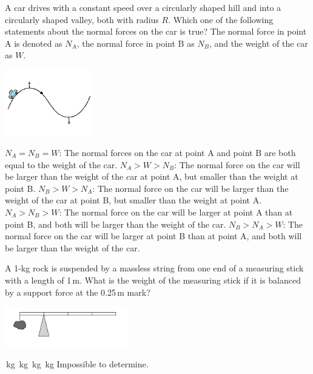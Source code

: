 \documentclass[letterpaper,addpoints,answers]{exam}
\begin{document}
\begin{questions}

\printanswers


\begin{question}[5]
\begin{multicols}{2}
A car drives with a constant speed over a circularly shaped hill and into a circularly shaped valley, both with radius $R$. Which one of the following statements about the normal forces on the car is true? The normal force in point A is denoted as $N_A$, the normal force in point B as $N_B$, and the weight of the car as $W$.
\begin{center}
\includegraphics[width=0.28\textwidth]{final/car_hill}
\end{center}
\end{multicols}
\begin{checkboxes}
 \choice $N_A = N_B = W$: The normal forces on the car at point A and point B are both equal to the weight of the car.
 \choice $N_A > W > N_B$: The normal force on the car will be larger than the weight of the car at point A, but smaller than the weight at point B.
 \correctchoice $N_B > W > N_A$: The normal force on the car will be larger than the weight of the car at point B, but smaller than the weight at point A.
 \choice $N_A > N_B > W$: The normal force on the car will be larger at point A than at point B, and both will be larger than the weight of the car.
 \choice $N_B > N_A > W$: The normal force on the car will be larger at point B than at point A, and both will be larger than the weight of the car.
\end{checkboxes}
\end{question}

\begin{question}[5]
\begin{multicols}{2}
A 1-kg rock is suspended by a massless string from one end of a measuring stick with a length of 1\,m. What is the weight of the measuring stick if it is balanced by a support force at the 0.25\,m mark?
\begin{center}
\includegraphics[width=0.4\textwidth]{final/rock_balance}
\end{center}
\end{multicols}
\begin{checkboxes}
 \,kg
 \,kg
 \,kg
 \,kg
 \choice Impossible to determine.
\end{checkboxes}
\end{question}


\end{questions}
\end{document}
